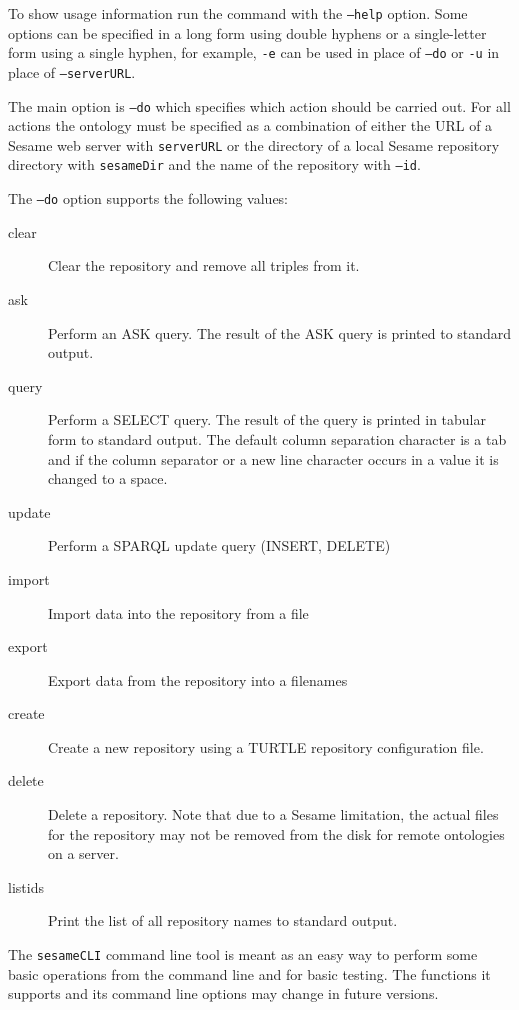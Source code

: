 {To show usage information run the command with the \texttt{--help} option. Some
options can be specified in a long form using double hyphens or a single-letter 
form using a single hyphen, for example, \texttt{-e} can be used in place of
\texttt{--do} or \texttt{-u} in place of \texttt{--serverURL}.

The main option is \texttt{--do} which specifies which action should be carried
out. For all actions the ontology must be specified as a combination of 
either the URL of a Sesame web server with \texttt{serverURL} or the 
directory of a local Sesame repository directory with \texttt{sesameDir} and the name 
of the repository with \texttt{--id}.

The \texttt{--do} option supports the following values:
\begin{description}
 \item [clear] Clear the repository and remove all triples from it.
 \item [ask] Perform an ASK query. The result of the ASK query is printed to standard output.
 \item [query] Perform a SELECT query. The result of the query is printed in tabular form to
   standard output. The default column separation character is a tab and  
   if the column separator or a new line character occurs in a value it is changed to 
   a space.
 \item [update] Perform a SPARQL update query (INSERT, DELETE)
 \item [import] Import data into the repository from a file
 \item [export] Export data from the repository into a filenames
 \item [create] Create a new repository using a TURTLE repository configuration file.
 \item [delete] Delete a repository. Note that due to a Sesame limitation, the actual
   files for the repository may not be removed from the disk for remote ontologies
   on a server.
 \item [listids] Print the list of all repository names to standard output.
\end{description}


The \texttt{sesameCLI} command line tool is meant as an easy way to perform
some basic operations from the command line and for basic testing. The functions
it supports and its command line options may change in future versions.



}
